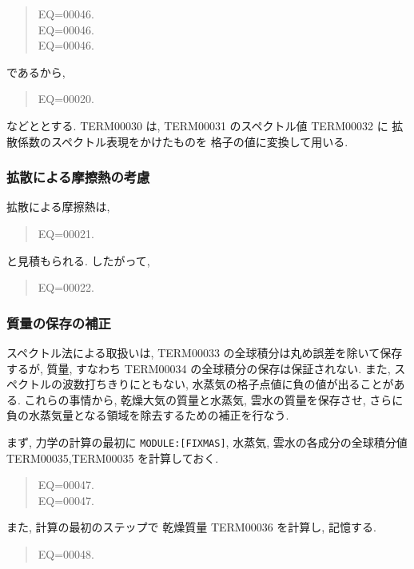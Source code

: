 \begin{quote}
\nonumber
EQ=00046.\\
\nonumber
EQ=00046.\\
EQ=00046.
\end{quote}
%
であるから,
\begin{quote}
EQ=00020.
\end{quote}
などととする.
TERM00030 は, TERM00031 のスペクトル値 TERM00032 に
拡散係数のスペクトル表現をかけたものを
格子の値に変換して用いる.

\subsubsection{拡散による摩擦熱の考慮}

拡散による摩擦熱は,
\begin{quote}
EQ=00021.
\end{quote}
と見積もられる.
したがって,
\begin{quote}
EQ=00022.
\end{quote}

\subsubsection{質量の保存の補正}

スペクトル法による取扱いは,
TERM00033 の全球積分は丸め誤差を除いて保存するが,
質量, すなわち TERM00034 の全球積分の保存は保証されない.
また, スペクトルの波数打ちきりにともない,
水蒸気の格子点値に負の値が出ることがある.
これらの事情から, 
乾燥大気の質量と水蒸気, 雲水の質量を保存させ,
さらに負の水蒸気量となる領域を除去するための補正を行なう.

まず, 力学の計算の最初に \texttt{MODULE:[FIXMAS]},
水蒸気, 雲水の各成分の全球積分値 TERM00035,TERM00035 を計算しておく.
\begin{quote}
EQ=00047.\\
EQ=00047.
\end{quote}
また, 計算の最初のステップで
乾燥質量 TERM00036 を計算し, 記憶する.
\begin{quote}
EQ=00048.
\end{quote}

